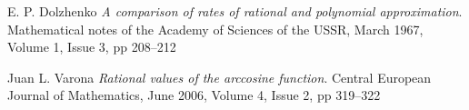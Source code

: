\documentclass[10pt]{article}
\begin{document}
\pagebreak
\begin{thebibliography}{9}
E. P. Dolzhenko
\textit{A comparison of rates of rational and polynomial approximation}. 
Mathematical notes of the Academy of Sciences of the USSR, March 1967, Volume 1, Issue 3, pp 208–212

Juan L. Varona
\textit{Rational values of the arccosine function}. 
Central European Journal of Mathematics, June 2006, Volume 4, Issue 2, pp 319–322
\end{thebibliography}
 
\end{document}
